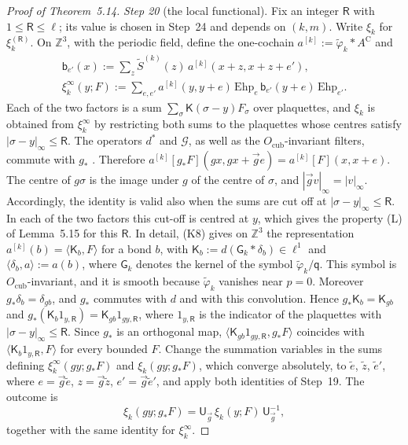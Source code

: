 \documentclass[11pt,letterpaper,reqno]{amsart}
\theoremstyle{definition}
\begin{document}
\begin{proof}[Proof of Theorem~5.14]
\emph{Step 20} (the local functional).
Fix an integer $\mathsf R$ with $1\le\mathsf R\le\ell$; its value is chosen in Step~24 and depends on $(k,m)$.
Write $\xi_k$ for $\xi_k^{(\mathsf R)}$.
On $\mathbb Z^3$, with the periodic field, define the one-cochain $a^{[k]}:=\tilde\varphi_k*A^{\mathrm C}$ and
\begin{gather*}
\mathsf b_{e'}(x):=\sum_z\tilde S^{(k)}(z)\,a^{[k]}(x+z,x+z+e'),\\
\xi_k^\infty(y;F):=\sum_{e,e'}a^{[k]}(y,y+e)\,\mathrm{Ehp}_e\,\mathsf b_{e'}(y+e)\,\mathrm{Ehp}_{e'}.
\end{gather*}
Each of the two factors is a sum $\sum_\sigma\mathsf K(\sigma-y)F_\sigma$ over plaquettes, and $\xi_k$ is obtained from $\xi_k^\infty$ by restricting both sums to the plaquettes whose centres satisfy $|\sigma-y|_\infty\le\mathsf R$.
The operators $d^*$ and $\mathcal G$, as well as the $O_{\mathrm{cub}}$-invariant filters, commute with $g_*$ \cite[Definition~2.1]{QEDII}.
Therefore $a^{[k]}[g_*F](gx,gx+\vec ge)=a^{[k]}[F](x,x+e)$.
The centre of $g\sigma$ is the image under $g$ of the centre of $\sigma$, and $|\vec gv|_\infty=|v|_\infty$.
Accordingly, the identity is valid also when the sums are cut off at $|\sigma-y|_\infty\le\mathsf R$.
In each of the two factors this cut-off is centred at $y$, which gives the property (L) of Lemma~5.15 for this $\mathsf R$.
In detail, (K8) gives on $\mathbb Z^3$ the representation $a^{[k]}(b)=\langle\mathsf K_b,F\rangle$ for a bond $b$, with $\mathsf K_b:=d(\mathsf G_k*\delta_b)\in\ell^1$ and $\langle\delta_b,a\rangle:=a(b)$, where $\mathsf G_k$ denotes the kernel of the symbol $\tilde\varphi_k/\mathsf q$.
This symbol is $O_{\mathrm{cub}}$-invariant, and it is smooth because $\tilde\varphi_k$ vanishes near $p=0$.
Moreover $g_*\delta_b=\delta_{gb}$, and $g_*$ commutes with $d$ and with this convolution.
Hence $g_*\mathsf K_b=\mathsf K_{gb}$ and $g_*(\mathsf K_b1_{y,\mathsf R})=\mathsf K_{gb}1_{gy,\mathsf R}$, where $1_{y,\mathsf R}$ is the indicator of the plaquettes with $|\sigma-y|_\infty\le\mathsf R$.
Since $g_*$ is an orthogonal map, $\langle\mathsf K_{gb}1_{gy,\mathsf R},g_*F\rangle$ coincides with $\langle\mathsf K_b1_{y,\mathsf R},F\rangle$ for every bounded $F$.
Change the summation variables in the sums defining $\xi_k^\infty(gy;g_*F)$ and $\xi_k(gy;g_*F)$, which converge absolutely, to $\tilde e$, $\tilde z$, $\tilde e'$, where $e=\vec g\tilde e$, $z=\vec g\tilde z$, $e'=\vec g\tilde e'$, and apply both identities of Step~19.
The outcome is
\begin{equation*}
\xi_k(gy;g_*F)=\mathsf U_{\vec g}\,\xi_k(y;F)\,\mathsf U_{\vec g}^{-1},
\end{equation*}
together with the same identity for $\xi_k^\infty$.


\end{proof}
\end{document}
